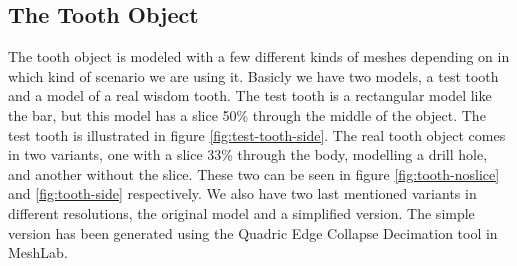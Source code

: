 \layoutnewpage

\subsection{The Tooth Object}
\label{sec:test-data-tooth}
The tooth object is modeled with a few different kinds of meshes
depending on in which kind of scenario we are using it. Basicly we
have two models, a test tooth and a model of a real wisdom tooth. The test
tooth is a rectangular model like the bar, but this model has a slice
50\% through the middle of the object. The test tooth is illustrated
in figure \vref{fig:test-tooth-side}. The real tooth object comes in
two variants, one with a slice 33\% through the body, modelling a
drill hole, and another without the slice. These two can be seen in
figure \ref{fig:tooth-noslice} and \vref{fig:tooth-side}
respectively. We also have two last mentioned variants in different
resolutions, the original model and a simplified version. The simple
version has been generated using the Quadric Edge Collapse Decimation
tool in MeshLab.

